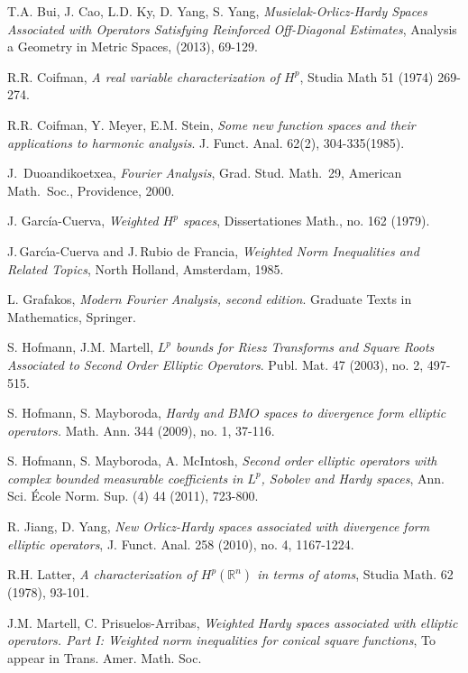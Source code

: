 \documentclass[11pt, a4paper,leqno]{amsart}
\theoremstyle{plain}
\theoremstyle{definition}
\theoremstyle{remark}
\numberwithin{equation}{section}
\def \R{ \mathbb{R} }
\begin{document}
\begin{thebibliography}{10}
T.A. Bui, J. Cao, L.D. Ky, D. Yang, S. Yang, {\em Musielak-Orlicz-Hardy Spaces Associated with
Operators Satisfying Reinforced Off-Diagonal
Estimates}, Analysis a Geometry in Metric Spaces, (2013), 69-129.




 R.R. Coifman, {\em A real variable characterization of $H^p$}, Studia Math 51 (1974)
269-274.

R.R. Coifman, Y. Meyer, E.M. Stein, {\em Some new function spaces
and their applications to harmonic analysis}. J. Funct. Anal.
62(2), 304-335(1985).


 J.~Duoandikoetxea, {\em Fourier Analysis},
Grad. Stud. Math.\ 29, American Math.\ Soc., Providence, 2000.


 J. Garc\'ia-Cuerva, {\em Weighted $H^p$ spaces}, Dissertationes Math., no. 162 (1979).

 J.\,Garc{\'\i}a-Cuerva and J.\,Rubio de Francia, {\it Weighted Norm
Inequalities and Related Topics}, North Holland, Amsterdam, 1985.


L. Grafakos, {\em Modern Fourier Analysis, second edition}. Graduate Texts in Mathematics, Springer.

S. Hofmann, J.M. Martell, {\em $L^p$ bounds for Riesz Transforms and Square Roots Associated to Second Order Elliptic Operators}. Publ. Mat. 47 (2003), no. 2, 497-515.


S. Hofmann, S. Mayboroda, {\em Hardy and $BMO$ spaces to divergence
form elliptic operators.} Math. Ann. 344 (2009), no. 1, 37-116.


S. Hofmann, S. Mayboroda, A. McIntosh, {\em Second order elliptic operators with complex
bounded measurable coefficients in $L^p$, Sobolev and Hardy spaces}, Ann. Sci. \'Ecole Norm. Sup. (4) 44 (2011), 723-800.

 R. Jiang, D. Yang, {\em New Orlicz-Hardy spaces associated with divergence form elliptic operators}, J. Funct. Anal. 258 (2010), no. 4, 1167-1224.



 R.H. Latter, {\em A characterization of $H^p(\R^n)$ in terms of atoms}, Studia Math. 62
(1978), 93-101.


J.M. Martell, C. Prisuelos-Arribas, {\em Weighted Hardy spaces associated with elliptic operators. Part I: Weighted norm inequalities for conical square functions}, To appear in Trans. Amer. Math. Soc.



\end{thebibliography}
\end{document}
